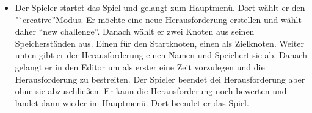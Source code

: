 \begin{itemize}
\item Der Spieler startet das Spiel und gelangt zum Hauptmenü. Dort wählt er den "`creative\textquotedblright Modus. Er möchte eine neue Herausforderung erstellen und wählt daher \textquotedblleft{}new challenge\textquotedblright. Danach wählt er zwei Knoten aus seinen Speicherständen aus. Einen für den Startknoten, einen als Zielknoten. Weiter unten gibt er der Herausforderung einen Namen und Speichert sie ab. Danach gelangt er in den Editor um als erster eine Zeit vorzulegen und die Herausforderung zu bestreiten. Der Spieler beendet dei Herausforderung aber ohne sie abzuschließen. Er kann die Herausforderung noch bewerten und landet dann wieder im Hauptmenü. Dort beendet er das Spiel.
\end{itemize}


%
%	
%	
%	
%


%
%




